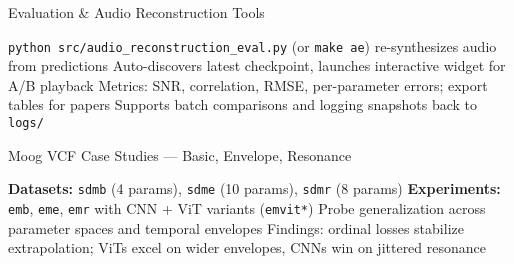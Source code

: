 \begin{slide}[\slideopts,toc={Evaluation}]{Evaluation & Audio Reconstruction Tools}
  \vspace{-0.75em}
  \begin{itemize}
    \mpitem \texttt{python src/audio\_reconstruction\_eval.py} (or \texttt{make ae}) re-synthesizes audio from predictions
    \mpitem Auto-discovers latest checkpoint, launches interactive widget for A/B playback
    \mpitem Metrics: SNR, correlation, RMSE, per-parameter errors; export tables for papers
    \mpitem Supports batch comparisons and logging snapshots back to \texttt{logs/}
  \end{itemize}
  \vspace{0.25em}
  \begin{center}
    \setlength{\fboxsep}{6pt}
  \end{center}
\end{slide}

\begin{slide}[\slideopts,toc={Experiments}]{Moog VCF Case Studies — Basic, Envelope, Resonance}
  \vspace{-0.75em}
  \begin{itemize}
    \mpitem \textbf{Datasets:} \texttt{sdmb} (4 params), \texttt{sdme} (10 params), \texttt{sdmr} (8 params)
    \mpitem \textbf{Experiments:} \texttt{emb}, \texttt{eme}, \texttt{emr} with CNN + ViT variants (\texttt{emvit*})
    \mpitem Probe generalization across parameter spaces and temporal envelopes
    \mpitem Findings: ordinal losses stabilize extrapolation; ViTs excel on wider envelopes, CNNs win on jittered resonance
  \end{itemize}
  \vspace{0.25em}
  \begin{center}
    \setlength{\fboxsep}{4pt}
  \end{center}
\end{slide}

